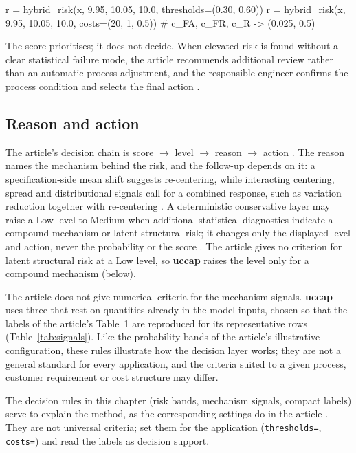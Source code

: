 \documentclass[a4paper,11pt,oneside,openany,parskip=half-,headings=standardclasses,toc=flat,numbers=noenddot]{scrbook}
\newcommand{\code}[1]{\texttt{\begingroup\def\_{\textunderscore\allowbreak}#1\endgroup}}
\newcommand{\pkg}{\textsf{\bfseries uccap}}
\newcommand{\tabref}[1]{Table~\ref{#1}}
\begin{document}
\begin{pycode}
r = hybrid_risk(x, 9.95, 10.05, 10.0, thresholds=(0.30, 0.60))
r = hybrid_risk(x, 9.95, 10.05, 10.0, costs=(20, 1, 0.5))   # c_FA, c_FR, c_R -> (0.025, 0.5)
\end{pycode}

The score prioritises; it does not decide. When elevated risk is found without a clear statistical failure mode, the
article recommends additional review rather than an automatic process adjustment, and the responsible engineer
confirms the process condition and selects the final action \cite[Sec.~5.2]{jy-hybrid}.

\subsection{Reason and action}\label{sec:reasons}
The article's decision chain is score $\to$ level $\to$ reason $\to$ action \cite[Sec.~5.1]{jy-hybrid}. The
reason names the mechanism behind the risk, and the follow-up depends on it: a specification-side mean shift
suggests re-centering, while interacting centering, spread and distributional signals call for a combined
response, such as variation reduction together with re-centering \cite[Sec.~5.2]{jy-hybrid}. A deterministic
conservative layer may raise a Low level to Medium when additional statistical diagnostics indicate a compound
mechanism or latent structural risk; it changes only the displayed level and action, never the probability or the
score \cite[Sec.~5.1]{jy-hybrid}. The article gives no criterion for latent structural risk at a Low level, so
\pkg{} raises the level only for a compound mechanism (below).

The article does not give numerical criteria for the mechanism signals. \pkg{} uses three that rest on quantities
already in the model inputs, chosen so that the labels of the article's Table~1 are reproduced for its
representative rows (\tabref{tab:signals}). Like the probability bands of the article's illustrative configuration,
these rules illustrate how the decision layer works; they are not a general standard for every application, and
the criteria suited to a given process, customer requirement or cost structure may differ.

\begin{caution}
The decision rules in this chapter (risk bands, mechanism signals, compact labels) serve to explain the method, as
the corresponding settings do in the article \cite[Sec.~5.1]{jy-hybrid}. They are not universal criteria; set
them for the application (\code{thresholds=}, \code{costs=}) and read the labels as decision support.
\end{caution}
\end{document}
